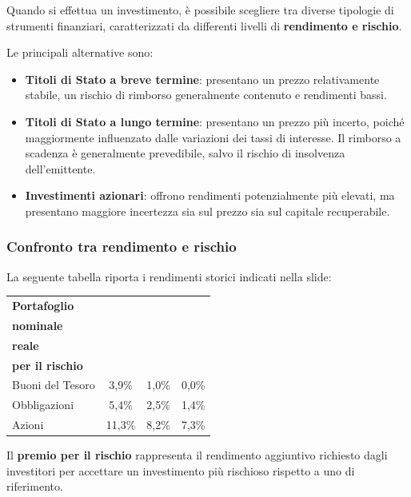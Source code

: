 \noindent Quando si effettua un investimento, è possibile scegliere tra diverse tipologie di strumenti finanziari, caratterizzati da differenti livelli di \textbf{rendimento e rischio}.

\medskip

\noindent Le principali alternative sono:

\begin{itemize}
    \item \textbf{Titoli di Stato a breve termine}: presentano un prezzo relativamente stabile, un rischio di rimborso generalmente contenuto e rendimenti bassi.

    \item \textbf{Titoli di Stato a lungo termine}: presentano un prezzo più incerto, poiché maggiormente influenzato dalle variazioni dei tassi di interesse. Il rimborso a scadenza è generalmente prevedibile, salvo il rischio di insolvenza dell'emittente.

    \item \textbf{Investimenti azionari}: offrono rendimenti potenzialmente più elevati, ma presentano maggiore incertezza sia sul prezzo sia sul capitale recuperabile.
\end{itemize}

\subsubsection*{Confronto tra rendimento e rischio}

\noindent La seguente tabella riporta i rendimenti storici indicati
nella slide:

\begin{center}
\renewcommand{\arraystretch}{1.3}
\begin{tabular}{|l|c|c|c|}
\hline
\textbf{Portafoglio} &
\shortstack{\textbf{Rendimento}\\\textbf{nominale}} &
\shortstack{\textbf{Rendimento}\\\textbf{reale}} &
\shortstack{\textbf{Premio}\\\textbf{per il rischio}} \\
\hline
Buoni del Tesoro & 3,9\% & 1,0\% & 0,0\% \\
\hline
Obbligazioni & 5,4\% & 2,5\% & 1,4\% \\
\hline
Azioni & 11,3\% & 8,2\% & 7,3\% \\
\hline
\end{tabular}
\end{center}

\noindent Il \textbf{premio per il rischio} rappresenta il rendimento aggiuntivo richiesto dagli investitori per accettare un investimento più rischioso rispetto a uno di riferimento.

